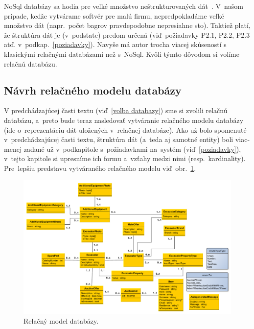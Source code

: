 NoSql databázy sa hodia pre veľké množstvo neštrukturovaných dát~\cite{nosql pros}. V~našom prípade, kedže vytvárame softvér pre malú firmu, nepredpokladáme veľké množstvo dát (napr.~počet bagrov pravdepodobne nepresiahne sto). Taktiež platí, že štruktúra dát je (v~podstate) predom určená (viď~požiadavky P2.1, P2.2, P2.3 atď. v~podkap.~\ref{poziadavky}). Navyše má  autor trocha viacej skúseností s klasickými relačnými databázami než s~NoSql. Kvôli týmto dôvodom si volíme relačnú databázu.

\subsection{Návrh relačného modelu databázy}
\label{navrh relacneho modelu databazy}

V predchádzajúcej časti textu (viď~\ref{volba databazy}) sme si zvolili relačnú databázu, a~preto bude teraz nasledovať vytváranie relačného modelu databázy~\cite{relational model} (ide o~reprezentáciu dát uložených v~relačnej databáze). Ako už bolo spomenuté v~predchádzajúcej časti textu, štruktúra dát (a~teda aj samotné entity) boli viac-menej zadané už v~podkapitole s~požiadavkami na~systém (viď~\ref{poziadavky}), v~tejto kapitole si upresníme ich formu a~vzťahy medzi nimi (resp.~kardinality). Pre~lepšiu predstavu vytváraného relačného modelu viď~obr.~\ref{relacny model uml}.

\begin{figure}[H]\centering
\includegraphics[width=140mm]{../img/relacny model uml}
\caption{Relačný model databázy.}
\label{relacny model uml}
\end{figure}

